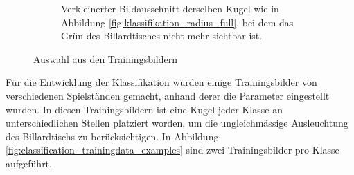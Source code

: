 \begin{figure}[h!]
\begin{subfigure}[t]{0.3\textwidth}
        \caption{
            Verkleinerter Bildausschnitt derselben Kugel wie in Abbildung \ref{fig:klassifikation_radius_full},
            bei dem das Grün des Billardtisches nicht mehr sichtbar ist.
        }
        \label{fig:klassifikation_radius_reduced}
    \end{subfigure}
    \caption{Auswahl aus den Trainingsbildern}
    \label{fig:klassifikation_radius}
\end{figure}

Für die Entwicklung der Klassifikation wurden einige Trainingsbilder von verschiedenen Spielständen gemacht,
anhand derer die Parameter eingestellt wurden.
In diesen Trainingsbildern ist eine Kugel jeder Klasse an unterschiedlichen Stellen platziert worden,
um die ungleichmässige Ausleuchtung des Billardtischs zu berücksichtigen.
In Abbildung \ref{fig:classification_trainingdata_examples} sind zwei Trainingsbilder pro Klasse aufgeführt.

